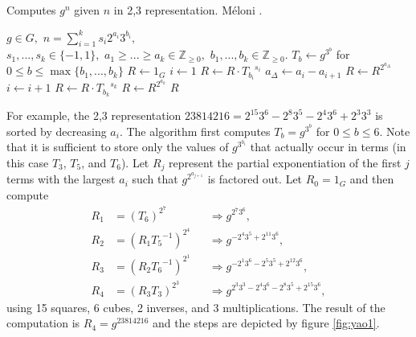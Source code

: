 \documentclass{ucalgthes1}
\theoremstyle{definition}
\newcommand{\ZZgez}{\mathbb{Z}_{\ge 0}}
\begin{document}
\begin{algorithm}[h]
\caption{Computes $g^n$ given $n$ in 2,3 representation. M\'{e}loni \cite[Section 3.2]{Meloni2009}.}
\label{alg:yaos}
\begin{algorithmic}[1]
\REQUIRE $g \in G,$ 
$n = \sum_{i=1}^k s_i2^{a_i}3^{b_i},$ \\
$s_1,...,s_k \in \{-1, 1\},$ 
$a_1 \ge ... \ge a_k \in \ZZgez,$ 
$b_1,...,b_k \in \ZZgez.$
\STATE $T_b \gets g^{3^b}$ for $0 \le b \le \max \{ b_1, ..., b_k \}$ 
\STATE $R \gets 1_G$
\STATE $i \gets 1$
	\STATE $R \gets R \cdot {T_{b_i}}^{s_i}$ 
	\STATE $a_\Delta \gets a_i - a_{i+1}$
	\STATE $R \gets R ^ {2^{a_\Delta}}$ 
	\STATE $i \gets i + 1$
\ENDWHILE
\STATE $R \gets R \cdot {T_{b_k}}^{s_k}$
\STATE $R \gets R ^ {2^{a_k}}$ 
\RETURN $R$
\end{algorithmic}
\end{algorithm}

For example, the 2,3 representation $23814216 = 2^{15} 3^6 - 2^8 3^5 - 2^4 3^6 + 2^3 3^3$ is sorted by decreasing $a_i$.  The algorithm first computes $T_b = g^{3^b}$ for $0 \le b \le 6$.  Note that it is sufficient to store only the values of $g^{3^{b_i}}$ that actually occur in terms (in this case $T_3$, $T_5$, and $T_6$).  Let $R_j$ represent the partial exponentiation of the first $j$ terms with the largest $a_i$ such that $g^{2^{a_{j+1}}}$ is factored out.  Let $R_0 = 1_G$ and then compute 
\begin{align*}
	R_1 &= \left( T_6 \right)^{2^7} &&\Rightarrow g^{2^7 3^6}, \\
	R_2 &= \left( R_1 {T_5}^{-1} \right)^{2^4} &&\Rightarrow g^{-2^4 3^5 + 2^{11} 3^6}, \\
	R_3 &= \left( R_2 {T_6}^{-1} \right)^{2^1} &&\Rightarrow g^{-2^1 3^6 -2^5 3^5 + 2^{12} 3^6}, \\
	R_4 &= \left( R_3 T_3 \right) ^ {2^3} &&\Rightarrow g^{2^3 3^3 -2^4 3^6 -2^8 3^5 + 2^{15} 3^6},
\end{align*}
using 15 squares, 6 cubes, 2 inverses, and 3 multiplications.  The result of the computation is $R_4 = g^{23814216}$ and the steps are depicted by figure \ref{fig:yao1}.
\end{document}
